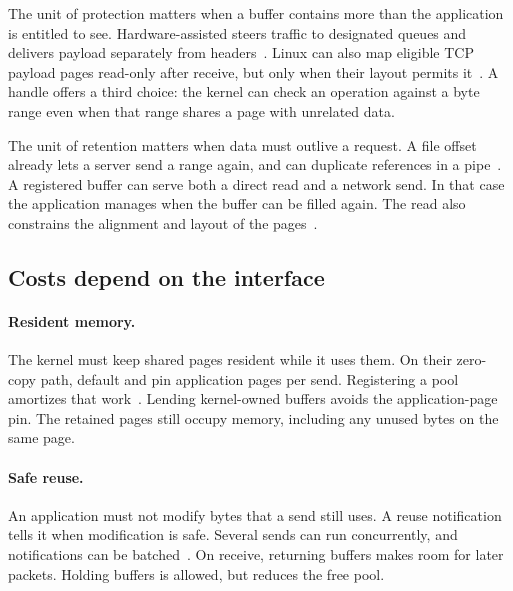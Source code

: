 The unit of protection matters when a buffer contains more than the application
is entitled to see. Hardware-assisted \recvzc steers traffic to designated
queues and delivers payload separately from headers~\cite{zcrx}. Linux can also
map eligible TCP payload pages read-only after receive, but only when their
layout permits it~\cite{tcpmmap}. A handle offers a third choice: the kernel can
check an operation against a byte range even when that range shares a page
with unrelated data.

The unit of retention matters when data must outlive a request. A file offset
already lets a server send a range again, and  can duplicate references
in a pipe~\cite{sendfileapi,spliceapi}. A registered buffer can serve both a
direct read and a network send. In that case the application manages when the
buffer can be filled again. The read also constrains the alignment and layout
of the pages~\cite{openapi}.

\subsection{Costs depend on the interface}
\label{sec:borrowing:costs}

\paragraph{Resident memory.} The kernel must keep shared pages resident while it uses them.
On their zero-copy path, default \sendzc and \msgzc pin application pages per
send. Registering a pool amortizes that work~\cite{msgzerocopy,sendzcdoc}.
Lending kernel-owned buffers avoids the application-page pin. The retained
pages still occupy memory, including any unused bytes on the same page.

\paragraph{Safe reuse.} An application must not modify bytes that a send still uses. A reuse
notification tells it when modification is safe. Several sends can run concurrently,
and notifications can be batched~\cite{msgzerocopy,sendzcdoc}. On receive, returning buffers makes
room for later packets. Holding buffers is allowed, but reduces the free pool.
